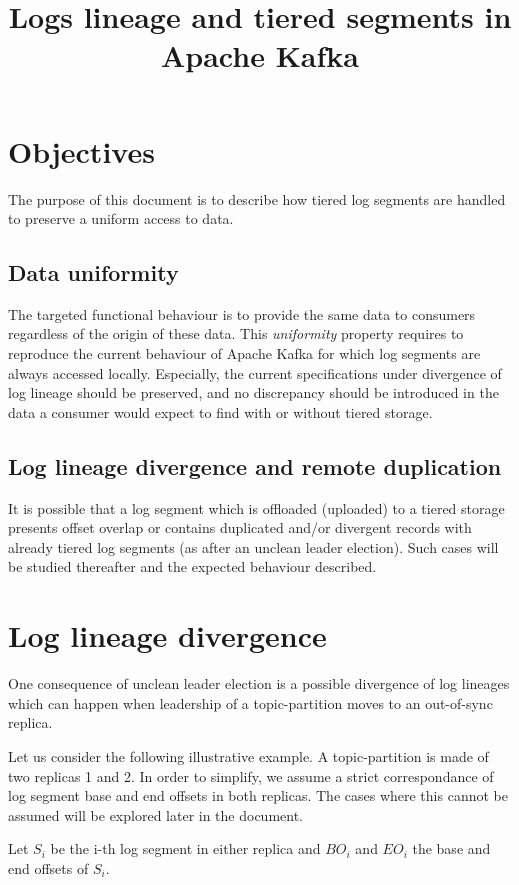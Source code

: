 \documentclass{article}
\title{Logs lineage and tiered segments in Apache Kafka}
\begin{document}
\section{Objectives}
The purpose of this document is to describe how tiered log segments are handled to preserve a uniform access to data.

\subsection{Data uniformity}

The targeted functional behaviour is to provide the same data to consumers regardless of the origin of these data. This \textit{uniformity} property requires to reproduce the current behaviour of Apache Kafka for which log segments are always accessed locally. Especially, the current specifications under divergence of log lineage should be preserved, and no discrepancy should be introduced in the data a consumer would expect to find with or without tiered storage.

\subsection{Log lineage divergence and remote duplication}

It is possible that a log segment which is offloaded (uploaded) to a tiered storage presents offset overlap or contains duplicated and/or divergent records with already tiered log segments (as after an unclean leader election).
Such cases will be studied thereafter and the expected behaviour described.

\section{Log lineage divergence}

One consequence of unclean leader election is a possible divergence of log lineages which can happen when leadership of a topic-partition moves to an out-of-sync replica. 

Let us consider the following illustrative example. A topic-partition is made of two replicas 1 and 2. In order to simplify, we assume a strict correspondance of log segment base and end offsets in both replicas. The cases where this cannot be assumed will be explored later in the document.

Let $S_i$ be the i-th log segment in either replica and $BO_i$ and $EO_i$ the base and end offsets of $S_i$. 
\end{document}

